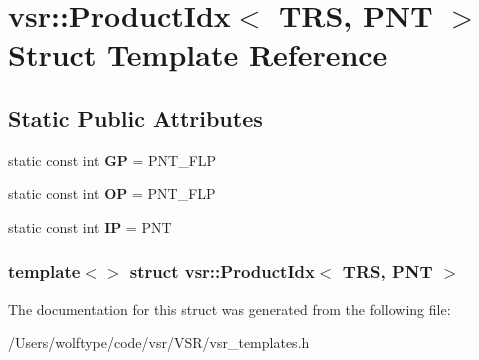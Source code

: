 \hypertarget{structvsr_1_1_product_idx_3_01_t_r_s_00_01_p_n_t_01_4}{\section{vsr\-:\-:Product\-Idx$<$ T\-R\-S, P\-N\-T $>$ Struct Template Reference}
\label{structvsr_1_1_product_idx_3_01_t_r_s_00_01_p_n_t_01_4}
}
\subsection*{Static Public Attributes}
\begin{DoxyCompactItemize}
\item 
\hypertarget{structvsr_1_1_product_idx_3_01_t_r_s_00_01_p_n_t_01_4_a5aabc0b88aaee8c7f7a919a95249b4a9}{static const int {\bfseries G\-P} = P\-N\-T\-\_\-\-F\-L\-P}\label{structvsr_1_1_product_idx_3_01_t_r_s_00_01_p_n_t_01_4_a5aabc0b88aaee8c7f7a919a95249b4a9}

\item 
\hypertarget{structvsr_1_1_product_idx_3_01_t_r_s_00_01_p_n_t_01_4_a0c5d06ba488472eea148ce9fa835d35c}{static const int {\bfseries O\-P} = P\-N\-T\-\_\-\-F\-L\-P}\label{structvsr_1_1_product_idx_3_01_t_r_s_00_01_p_n_t_01_4_a0c5d06ba488472eea148ce9fa835d35c}

\item 
\hypertarget{structvsr_1_1_product_idx_3_01_t_r_s_00_01_p_n_t_01_4_acf7e25725997fe2da981da73832100b9}{static const int {\bfseries I\-P} = P\-N\-T}\label{structvsr_1_1_product_idx_3_01_t_r_s_00_01_p_n_t_01_4_acf7e25725997fe2da981da73832100b9}

\end{DoxyCompactItemize}
\subsubsection*{template$<$$>$ struct vsr\-::\-Product\-Idx$<$ T\-R\-S, P\-N\-T $>$}



The documentation for this struct was generated from the following file\-:\begin{DoxyCompactItemize}
\item 
/\-Users/wolftype/code/vsr/\-V\-S\-R/vsr\-\_\-templates.\-h\end{DoxyCompactItemize}
